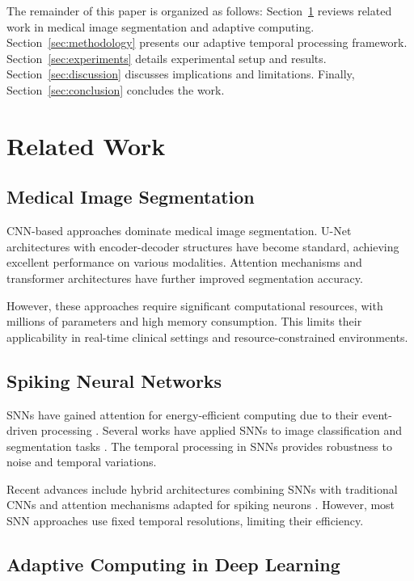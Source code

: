 \documentclass[12pt,a4paper]{article}
\begin{document}
The remainder of this paper is organized as follows: Section~\ref{sec:related_work} reviews related work in medical image segmentation and adaptive computing. Section~\ref{sec:methodology} presents our adaptive temporal processing framework. Section~\ref{sec:experiments} details experimental setup and results. Section~\ref{sec:discussion} discusses implications and limitations. Finally, Section~\ref{sec:conclusion} concludes the work.

\newpage
\section{Related Work}
\label{sec:related_work}

\subsection{Medical Image Segmentation}

CNN-based approaches dominate medical image segmentation. U-Net architectures \cite{ronneberger2015u} with encoder-decoder structures have become standard, achieving excellent performance on various modalities. Attention mechanisms \cite{wang2022medical} and transformer architectures \cite{hatamizadeh2022unetr} have further improved segmentation accuracy.

However, these approaches require significant computational resources, with millions of parameters and high memory consumption. This limits their applicability in real-time clinical settings and resource-constrained environments.

\subsection{Spiking Neural Networks}

SNNs have gained attention for energy-efficient computing due to their event-driven processing \cite{tavanaei2019deep}. Several works have applied SNNs to image classification \cite{fang2023spikingjelly} and segmentation tasks \cite{kim2022spiking}. The temporal processing in SNNs provides robustness to noise and temporal variations.

Recent advances include hybrid architectures combining SNNs with traditional CNNs \cite{sengupta2019going} and attention mechanisms adapted for spiking neurons \cite{zheng2023going}. However, most SNN approaches use fixed temporal resolutions, limiting their efficiency.

\subsection{Adaptive Computing in Deep Learning}
\end{document}
